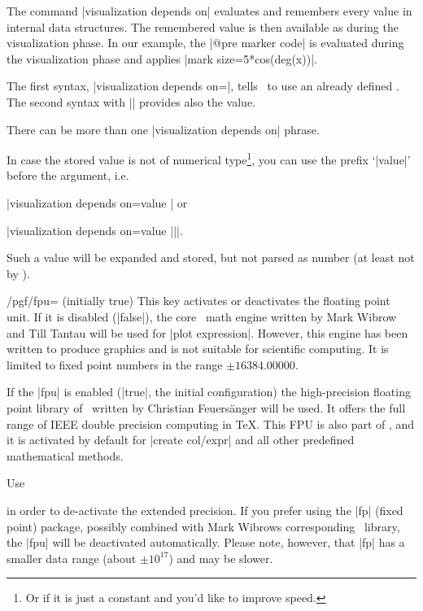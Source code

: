 \begin{pgfplotskeylist}
	The command |visualization depends on| evaluates and remembers every value in internal data structures. The remembered value is then available as  during the visualization phase. In our example, the |@pre marker code| is evaluated during the visualization phase and applies |mark size=5*cos(deg(x))|.
	
	The first syntax, |visualization depends on=|, tells \PGFPlots\ to use an already defined . The second syntax with |\as| provides also the value.

	There can be more than one |visualization depends on| phrase.

	In case the stored value is not of numerical type\footnote{Or if it is just a constant and you'd like to improve speed.}, you can use the prefix `|value|' before the argument, i.e.

	|visualization depends on=value | or

	|visualization depends on=value ||\as |.

	Such a value will be expanded and stored, but not parsed as number (at least not by \PGFPlots).
\end{pgfplotskeylist}

\begin{key}{/pgf/fpu= (initially true)}
	This key activates or deactivates the floating point unit. If it is disabled (|false|), the core \PGF\ math engine written by Mark Wibrow and Till Tantau will be used for |plot expression|.
	However, this engine has been written to produce graphics and is not suitable for scientific computing. It is limited to fixed point numbers in the range $\pm 16384.00000$.

	If the |fpu| is enabled (|true|, the initial configuration) the high-precision floating point library of \PGF\ written by Christian Feuers\"anger will be used. It offers the full range of IEEE double precision computing in \TeX. This FPU is also part of \PGFPlotstable, and it is activated by default for |create col/expr| and all other predefined mathematical methods.

	Use
\begin{codeexample}
\end{codeexample}
	\noindent in order to de-activate the extended precision. If you prefer using the |fp| (fixed point) package, possibly combined with Mark Wibrows corresponding \PGF\ library, the |fpu| will be deactivated automatically. Please note, however, that |fp| has a smaller data range (about $\pm 10^{17}$) and may be slower.
\end{key}
